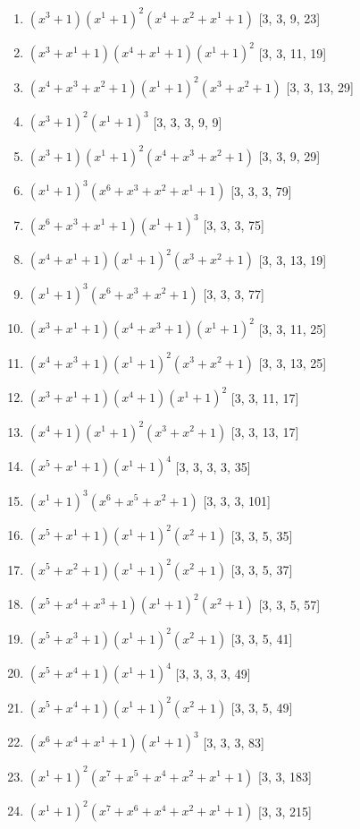 \documentclass[10pt,twocolumn]{article}
\begin{document}
\begin{enumerate}
\item $(x^{3} + 1)(x^{1} + 1)^{2}(x^{4} + x^{2} + x^{1} + 1)$  [3, 3, 9, 23]
\item $(x^{3} + x^{1} + 1)(x^{4} + x^{1} + 1)(x^{1} + 1)^{2}$  [3, 3, 11, 19]
\item $(x^{4} + x^{3} + x^{2} + 1)(x^{1} + 1)^{2}(x^{3} + x^{2} + 1)$  [3, 3, 13, 29]
\item $(x^{3} + 1)^{2}(x^{1} + 1)^{3}$  [3, 3, 3, 9, 9]
\item $(x^{3} + 1)(x^{1} + 1)^{2}(x^{4} + x^{3} + x^{2} + 1)$  [3, 3, 9, 29]
\item $(x^{1} + 1)^{3}(x^{6} + x^{3} + x^{2} + x^{1} + 1)$  [3, 3, 3, 79]
\item $(x^{6} + x^{3} + x^{1} + 1)(x^{1} + 1)^{3}$  [3, 3, 3, 75]
\item $(x^{4} + x^{1} + 1)(x^{1} + 1)^{2}(x^{3} + x^{2} + 1)$  [3, 3, 13, 19]
\item $(x^{1} + 1)^{3}(x^{6} + x^{3} + x^{2} + 1)$  [3, 3, 3, 77]
\item $(x^{3} + x^{1} + 1)(x^{4} + x^{3} + 1)(x^{1} + 1)^{2}$  [3, 3, 11, 25]
\item $(x^{4} + x^{3} + 1)(x^{1} + 1)^{2}(x^{3} + x^{2} + 1)$  [3, 3, 13, 25]
\item $(x^{3} + x^{1} + 1)(x^{4} + 1)(x^{1} + 1)^{2}$  [3, 3, 11, 17]
\item $(x^{4} + 1)(x^{1} + 1)^{2}(x^{3} + x^{2} + 1)$  [3, 3, 13, 17]
\item $(x^{5} + x^{1} + 1)(x^{1} + 1)^{4}$  [3, 3, 3, 3, 35]
\item $(x^{1} + 1)^{3}(x^{6} + x^{5} + x^{2} + 1)$  [3, 3, 3, 101]
\item $(x^{5} + x^{1} + 1)(x^{1} + 1)^{2}(x^{2} + 1)$  [3, 3, 5, 35]
\item $(x^{5} + x^{2} + 1)(x^{1} + 1)^{2}(x^{2} + 1)$  [3, 3, 5, 37]
\item $(x^{5} + x^{4} + x^{3} + 1)(x^{1} + 1)^{2}(x^{2} + 1)$  [3, 3, 5, 57]
\item $(x^{5} + x^{3} + 1)(x^{1} + 1)^{2}(x^{2} + 1)$  [3, 3, 5, 41]
\item $(x^{5} + x^{4} + 1)(x^{1} + 1)^{4}$  [3, 3, 3, 3, 49]
\item $(x^{5} + x^{4} + 1)(x^{1} + 1)^{2}(x^{2} + 1)$  [3, 3, 5, 49]
\item $(x^{6} + x^{4} + x^{1} + 1)(x^{1} + 1)^{3}$  [3, 3, 3, 83]
\item $(x^{1} + 1)^{2}(x^{7} + x^{5} + x^{4} + x^{2} + x^{1} + 1)$  [3, 3, 183]
\item $(x^{1} + 1)^{2}(x^{7} + x^{6} + x^{4} + x^{2} + x^{1} + 1)$  [3, 3, 215]

\end{enumerate}
\end{document}
